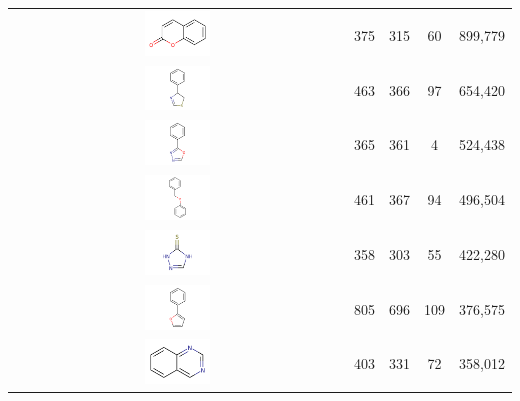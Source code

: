 \begin{table}
\begin{center}
\begin{tabular}{ |c|c|c|c|c| }
\includegraphics[align=c,width=0.2\textwidth]{data/badapple/scaf_07.png} & 375 & 315 & 60 & 899,779 \\
\includegraphics[align=c,width=0.2\textwidth]{data/badapple/scaf_08.png} & 463 & 366 & 97 & 654,420 \\
\includegraphics[align=c,width=0.2\textwidth]{data/badapple/scaf_09.png} & 365 & 361 & 4 & 524,438 \\
\includegraphics[align=c,width=0.2\textwidth]{data/badapple/scaf_10.png} & 461 & 367 & 94 & 496,504 \\
\includegraphics[align=c,width=0.2\textwidth]{data/badapple/scaf_11.png} & 358 & 303 & 55 & 422,280 \\
\includegraphics[align=c,width=0.2\textwidth]{data/badapple/scaf_12.png} & 805 & 696 & 109 & 376,575 \\
\includegraphics[align=c,width=0.2\textwidth]{data/badapple/scaf_13.png} & 403 & 331 & 72 & 358,012 \\

\end{tabular}
\end{center}
\end{table}
